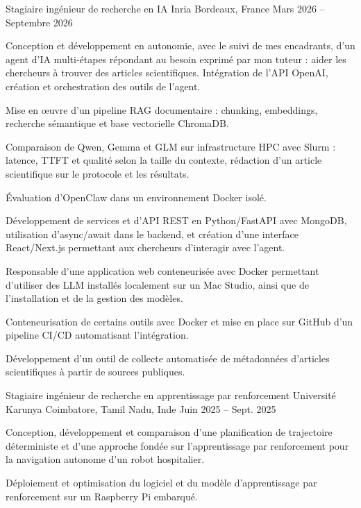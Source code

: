 
\begin{cventries}
  \cventry
    {Stagiaire ingénieur de recherche en IA}
    {Inria}
    {Bordeaux, France}
    {Mars 2026 -- Septembre 2026}
    {
      \begin{cvitems}
        \item {Conception et développement en autonomie, avec le suivi de mes encadrants, d’un agent d’IA multi-étapes répondant au besoin exprimé par mon tuteur : aider les chercheurs à trouver des articles scientifiques. Intégration de l’API OpenAI, création et orchestration des outils de l’agent.}
        \item {Mise en œuvre d’un pipeline RAG documentaire : chunking, embeddings, recherche sémantique et base vectorielle ChromaDB.}
        \item {Comparaison de Qwen, Gemma et GLM sur infrastructure HPC avec Slurm : latence, TTFT et qualité selon la taille du contexte, rédaction d’un article scientifique sur le protocole et les résultats.}
        \item {Évaluation d’OpenClaw dans un environnement Docker isolé.}
        \item {Développement de services et d’API REST en Python/FastAPI avec MongoDB, utilisation d’async/await dans le backend, et création d’une interface React/Next.js permettant aux chercheurs d’interagir avec l’agent.}
        \item {Responsable d’une application web conteneurisée avec Docker permettant d’utiliser des LLM installés localement sur un Mac Studio, ainsi que de l’installation et de la gestion des modèles.}
        \item {Conteneurisation de certains outils avec Docker et mise en place sur GitHub d’un pipeline CI/CD automatisant l’intégration.}
        \item {Développement d’un outil de collecte automatisée de métadonnées d’articles scientifiques à partir de sources publiques.}
      \end{cvitems}
    }

  \cventry
    {Stagiaire ingénieur de recherche en apprentissage par renforcement}
    {Université Karunya}
    {Coimbatore, Tamil Nadu, Inde}
    {Juin 2025 -- Sept. 2025}
    {
      \begin{cvitems}
        \item {Conception, développement et comparaison d’une planification de trajectoire déterministe et d’une approche fondée sur l’apprentissage par renforcement pour la navigation autonome d’un robot hospitalier.}
        \item {Déploiement et optimisation du logiciel et du modèle d’apprentissage par renforcement sur un Raspberry Pi embarqué.}
      \end{cvitems}
    }
\end{cventries}
